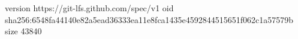 version https://git-lfs.github.com/spec/v1
oid sha256:6548fa44140e82a5ead36333ea11e8fca1435e4592844515651f062c1a57579b
size 43840
